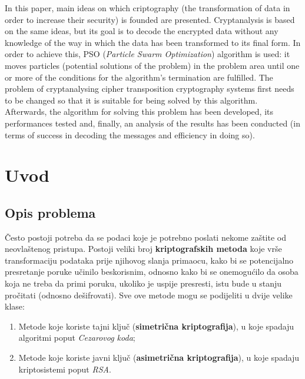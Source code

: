 \documentclass[12pt, a4paper]{article}
\begin{document}
In this paper, main ideas on which criptography (the transformation of data in order to increase their security) is founded are presented. Cryptanalysis is based on the same ideas, but its goal is to decode the encrypted data without any knowledge of the way in which the data has been transformed to its final form. In order to achieve this, PSO (\textit{Particle Swarm Optimization}) algorithm is used: it moves particles (potential solutions of the problem) in the problem area until one or more of the conditions for the algorithm's termination are fulfilled. The problem of cryptanalysing cipher transposition cryptography systems first needs to be changed so that it is suitable for being solved by this algorithm. Afterwards, the algorithm for solving this problem has been developed, its performances tested and, finally, an analysis of the results has been conducted (in terms of success in decoding the messages and efficiency in doing so).

\newpage

\tableofcontents

\newpage

\setcounter{page}{1}

\section{Uvod}

\subsection{Opis problema}

Često postoji potreba da se podaci koje je potrebno poslati nekome zaštite od neovlaštenog pristupa. Postoji veliki broj \textbf{kriptografskih metoda} koje vrše transformaciju podataka prije njihovog slanja primaocu, kako bi se potencijalno presretanje poruke učinilo beskorisnim, odnosno kako bi se onemogućilo da osoba koja ne treba da primi poruku, ukoliko je uspije presresti, istu bude u stanju pročitati (odnosno dešifrovati). Sve ove metode mogu se podijeliti u dvije velike klase:

\begin{enumerate}

\item Metode koje koriste tajni ključ (\textbf{simetrična kriptografija}), u koje spadaju algoritmi poput \textit{Cezarovog koda};
\item Metode koje koriste javni ključ (\textbf{asimetrična kriptografija}), u koje spadaju kriptosistemi poput \textit{RSA}.

\end{enumerate}
\end{document}
